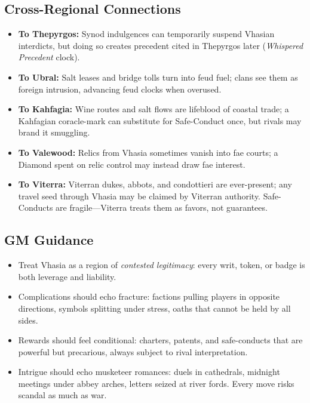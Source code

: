 \subsection*{Cross-Regional Connections}
\label{sec:vhasia-cross}
\begin{itemize}
\item \textbf{To Thepyrgos:} Synod indulgences can temporarily suspend Vhasian interdicts, but doing so creates precedent cited in Thepyrgos later (\emph{Whispered Precedent} clock).
\item \textbf{To Ubral:} Salt leases and bridge tolls turn into feud fuel; clans see them as foreign intrusion, advancing feud clocks when overused.
\item \textbf{To Kahfagia:} Wine routes and salt flows are lifeblood of coastal trade; a Kahfagian coracle-mark can substitute for Safe-Conduct once, but rivals may brand it smuggling.
\item \textbf{To Valewood:} Relics from Vhasia sometimes vanish into fae courts; a Diamond spent on relic control may instead draw fae interest.
\item \textbf{To Viterra:} Viterran dukes, abbots, and condottieri are ever-present; any travel seed through Vhasia may be claimed by Viterran authority. Safe-Conducts are fragile—Viterra treats them as favors, not guarantees.
\end{itemize}

\subsection*{GM Guidance}
\label{sec:vhasia-gm}
\begin{itemize}
\item Treat Vhasia as a region of \emph{contested legitimacy}: every writ, token, or badge is both leverage and liability.
\item Complications should echo fracture: factions pulling players in opposite directions, symbols splitting under stress, oaths that cannot be held by all sides.
\item Rewards should feel conditional: charters, patents, and safe-conducts that are powerful but precarious, always subject to rival interpretation.
\item Intrigue should echo musketeer romances: duels in cathedrals, midnight meetings under abbey arches, letters seized at river fords. Every move risks scandal as much as war.
\end{itemize}


